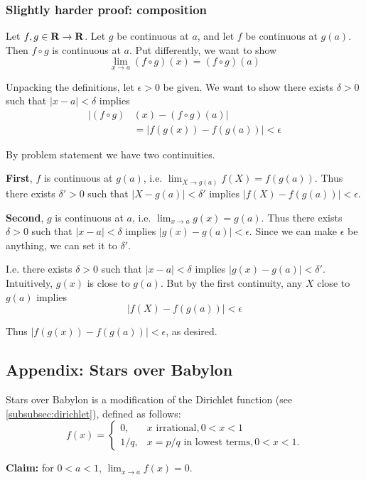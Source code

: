 \subsubsection*{Slightly harder proof: composition}

Let $f,g\in\mathbf{R}\to\mathbf{R}$. Let $g$ be continuous at $a$, and let $f$ be
continuous at $g(a)$. Then $f\circ g$ is continuous at $a$. Put
differently, we want to show
\[\lim_{x\to a}(f\circ g)(x)=(f\circ g)(a)\]

Unpacking the definitions, let $\epsilon>0$ be given. We want to show there
exists $\delta>0$ such that $|x-a|<\delta$ implies
\begin{align*}
    |(f\circ g)&(x)-(f\circ g)(a)|\\
    &=|f(g(x))-f(g(a))|<\epsilon
\end{align*}

By problem statement we have two continuities.

\vs

\textbf{First}, $f$ is continuous at $g(a)$, i.e.
$\lim_{X\to g(a)}f(X)=f(g(a))$. Thus there exists $\delta'>0$ such that
$|X-g(a)|<\delta'$ implies $|f(X)-f(g(a))|<\epsilon$.

\vs

\textbf{Second}, $g$ is continuous at $a$, i.e.
$\lim_{x\to a}g(x)=g(a)$. Thus there exists $\delta>0$ such that
$|x-a|<\delta$ implies $|g(x)-g(a)|<\epsilon$. Since we can make
$\epsilon$ be anything, we can set it to $\delta'$.

\vs

I.e. there exists $\delta>0$ such that $|x-a|<\delta$ implies
$|g(x)-g(a)|<\delta'$. Intuitively, $g(x)$ is close to $g(a)$. But by the
first continuity, any $X$ close to $g(a)$ implies
\[|f(X)-f(g(a))|<\epsilon\]

Thus $|f(g(x))-f(g(a))|<\epsilon$, as desired.

\subsection{Appendix: Stars over Babylon}
Stars over Babylon is a modification of the Dirichlet function (see
\ref{subsubsec:dirichlet}), defined as follows:
\[
f(x) = 
\begin{cases} 
  0, & \text{$x$ irrational}, 0<x<1\\
  1/q, & x=p/q \text{ in lowest terms}, 0<x<1.
\end{cases}
\]

\textbf{Claim:} for $0<a<1$, $\lim_{x\to a}f(x)=0$.

